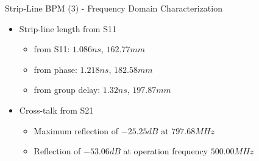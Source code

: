 \documentclass{beamer}
\begin{document}
\begin{frame}[t,fragile]{Strip-Line BPM (3) - Frequency Domain Characterization}
\begin{itemize}
\item Strip-line length from S11
\begin{itemize}
\item from S11: $1.086 ns$, $162.77 mm$

\item from phase: $1.218 ns$, $182.58 mm$
\item from group delay: $1.32  ns$, $197.87 mm$
\end{itemize}
\item Cross-talk from S21
\begin{itemize}
\item Maximum reflection of $ -25.25 dB$ at $797.68 MHz$ 
\item Reflection of $ -53.06 dB$ at operation frequency $ 500.00 MHz$
\end{itemize}
\end{itemize}

\begin{figure}
  \centering
  \quad
  \\
\end{figure}

\end{frame}
\end{document}

